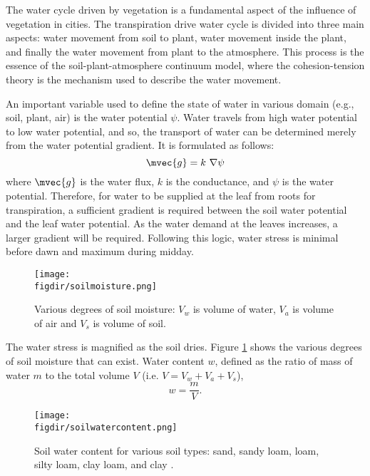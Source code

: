 The water cycle driven by vegetation is a fundamental aspect of the influence of vegetation in cities. The transpiration drive water cycle is divided into three main aspects: water movement from soil to plant, water movement inside the plant, and finally the water movement from plant to the atmosphere. This process is the essence of the soil-plant-atmosphere continuum model, where the cohesion-tension theory is the mechanism used to describe the water movement. 

An important variable used to define the state of water in various domain (e.g., soil, plant, air) is the water potential $\psi$. Water travels from high water potential to low water potential, and so, the transport of water can be determined merely from the water potential gradient. It is formulated as follows:
\begin{equation}
\mvec{g} = k\ \nabla \psi
\end{equation}
where $\mvec{g}$ is the water flux, $k$ is the conductance, and $\psi$ is the water potential. Therefore, for water to be supplied at the leaf from roots for transpiration, a sufficient gradient is required between the soil water potential and the leaf water potential. As the water demand at the leaves increases, a larger gradient will be required. Following this logic, water stress is minimal before dawn and maximum during midday. 

\begin{figure}[h]
	\centering
	\texttt{[image: \\figdir/soilmoisture.png]}
	\caption{Various degrees of soil moisture: $V_w$ is volume of water, $V_a$ is volume of air and $V_s$ is volume of soil.}
	\label{fig:soilmoisture}
\end{figure}

The water stress is magnified as the soil dries. Figure \ref{fig:soilmoisture} shows the various degrees of soil moisture that can exist. Water content $w$, defined as the ratio of mass of water $m$ to the total volume $V$ (i.e. $V=V_w+V_a+V_s$),
\begin{equation}
w = \frac{m}{V}.
\end{equation}


\begin{figure}[t]
	\centering
	\texttt{[image: \\figdir/soilwatercontent.png]}
	\caption{Soil water content for various soil types: sand, sandy loam, loam, silty loam, clay loam, and clay \citep{nobel2009physicochemical}. }
	\label{fig:soilwatercontent}
\end{figure}

